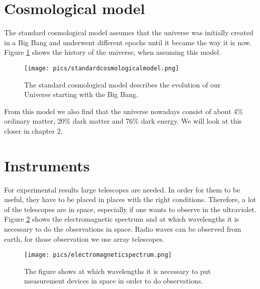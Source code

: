 \section{Cosmological model}
The standard cosmological model assumes that the universe was initially created in a Big Bang and underwent different epochs until it became the way it is now. Figure \ref{fig:standardcosmologicalmodel} shows the history of the universe, when assuming this model. 
\begin{figure}[H]
	\centering
		\texttt{[image: pics/standardcosmologicalmodel.png]}
		\caption{The standard cosmological model describes the evolution of our Universe starting with the Big Bang.}
		\label{fig:standardcosmologicalmodel}
\end{figure}
From this model we also find that the universe nowadays consist of about 4\% ordinary matter, 20\% dark matter and 76\% dark energy. We will look at this closer in chapter 2. 

\section{Instruments}
For experimental results large telescopes are needed. In order for them to be useful, they have to be placed in places with the right conditions. Therefore, a lot of the telescopes are in space, especially if one wants to observe in the ultraviolet. Figure \ref{fig:electromagneticspectrum} shows the electromagnetic spectrum and at which wavelengths it is necessary to do the observations in space. Radio waves can be observed from earth, for those observation we use array telescopes. 
\begin{figure}[H]
	\centering
		\texttt{[image: pics/electromagneticspectrum.png]}
		\caption{The figure shows at which wavelengths it is necessary to put measurement devices in space in order to do observations.}
		\label{fig:electromagneticspectrum}
\end{figure}

